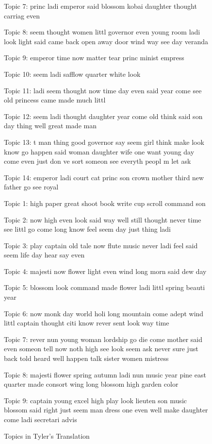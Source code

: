 \documentclass[12pt]{article}
\begin{document}
\begin{flushleft}
\begin{spacing}{2.0}
\begin{figure}
Topic 7: princ ladi emperor said blossom kobai daughter thought carriag even 

Topic 8: seem thought women littl governor even young room ladi look light said came back open away door wind way see day veranda 

Topic 9: emperor time now matter tear princ minist empress 

Topic 10: seem ladi safflow quarter white look 

Topic 11: ladi seem thought now time day even said year come see old princess came made much littl 

Topic 12: seem ladi thought daughter year come old think said son day thing well great made man 

Topic 13: t man thing good governor say seem girl think make look know go happen said woman daughter wife one want young day come even just don ve sort someon see everyth peopl m let ask 

Topic 14: emperor ladi court cat princ son crown mother third new father go see royal 
\end{figure}

\begin{figure}
\label{tyler-topics}
\caption{Topics in Tyler's Translation}
\singlespacing
\small
Topic 1: high paper great shoot book write cup scroll command son 

Topic 2: now high even look said way well still thought never time see littl go come long know feel seem day just thing ladi 

Topic 3: play captain old tale now flute music never ladi feel said seem life day hear say even 

Topic 4: majesti now flower light even wind long morn said dew day 

Topic 5: blossom look command made flower ladi littl spring beauti year 

Topic 6: now monk day world holi long mountain come adept wind littl captain thought citi know rever sent look way time 

Topic 7: rever nun young woman lordship go die come mother said even someon tell now noth high see look seem ask never sure just back told heard well happen talk sister women mistress 

Topic 8: majesti flower spring autumn ladi nun music year pine east quarter made consort wing long blossom high garden color 

Topic 9: captain young excel high play look lieuten son music blossom said right just seem man dress one even well make daughter come ladi secretari advis 


\end{figure}
\end{spacing}
\end{flushleft}
\end{document}

